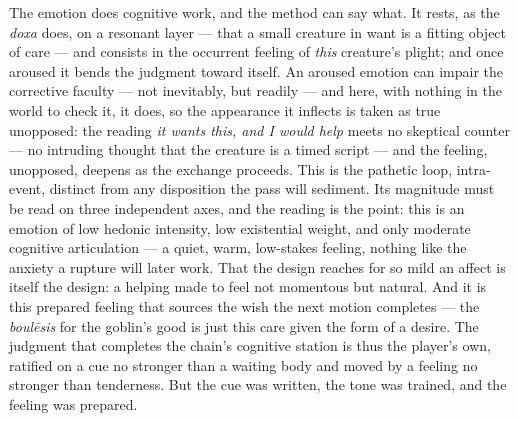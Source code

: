 \documentclass{article}
\begin{document}
The emotion does cognitive work, and the method can say what. It rests, as the \textit{doxa} does, on a resonant layer — that a small creature in want is a fitting object of care — and consists in the occurrent feeling of \textit{this} creature's plight; and once aroused it bends the judgment toward itself. An aroused emotion can impair the corrective faculty — not inevitably, but readily — and here, with nothing in the world to check it, it does, so the appearance it inflects is taken as true unopposed: the reading \textit{it wants this, and I would help} meets no skeptical counter — no intruding thought that the creature is a timed script — and the feeling, unopposed, deepens as the exchange proceeds. This is the pathetic loop, intra-event, distinct from any disposition the pass will sediment. Its magnitude must be read on three independent axes, and the reading is the point: this is an emotion of low hedonic intensity, low existential weight, and only moderate cognitive articulation — a quiet, warm, low-stakes feeling, nothing like the anxiety a rupture will later work. That the design reaches for so mild an affect is itself the design: a helping made to feel not momentous but natural. And it is this prepared feeling that sources the wish the next motion completes — the \textit{boulēsis} for the goblin's good is just this care given the form of a desire. The judgment that completes the chain's cognitive station is thus the player's own, ratified on a cue no stronger than a waiting body and moved by a feeling no stronger than tenderness. But the cue was written, the tone was trained, and the feeling was prepared.
\end{document}
